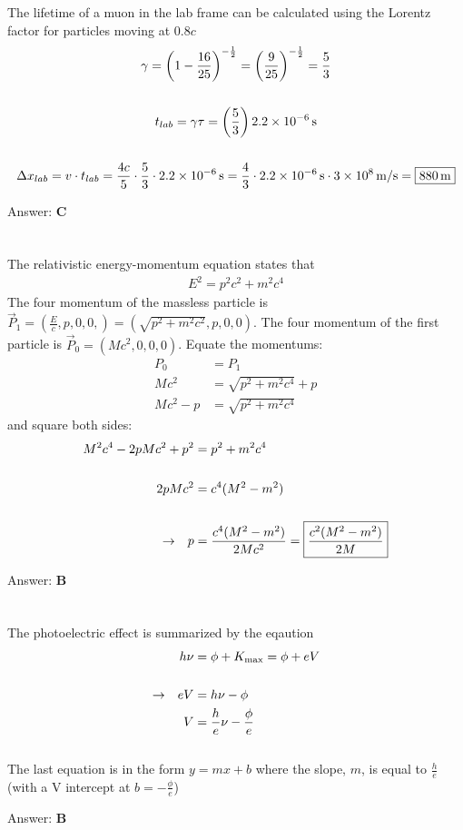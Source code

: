 \documentclass[12pt]{article}
\newcommand{\Answer}[1]{Answer: \textbf{#1}}
\newcommand{\Problem}[3]{
    \setcounter{section}{#1}
    \addtocounter{section}{-1}
    \section{}
    #3\par\par
    \Answer{#2}
}
\begin{document}
\Problem{39}{C}{%
The lifetime of a muon in the lab frame can be calculated using the Lorentz factor for particles moving at $0.8c$
\begin{gather}
\gamma = {\left(1- \frac{16}{25} \right)}^{-\frac{1}{2}} = {\left(\frac{9}{25}\right)}^{-\frac{1}{2}} = \frac{5}{3}\nonumber\\
\nonumber\\
t_{lab} = \gamma \tau = \left(\frac{5}{3}\right) 2.2\times 10^{-6}\,\text{s} \nonumber\\
\nonumber\\
\Delta x_{lab} = v \cdot t_{lab} = \frac{4 c}{5}\cdot \frac{5}{3}\cdot 2.2\times 10^{-6}\,\text{s} = \frac{4}{3}\cdot 2.2\times 10^{-6}\,\text{s} \cdot 3\times 10^{8}\,\text{m/s} = \boxed{880\,\text{m}} \nonumber
\end{gather}
}

\Problem{40}{B}{%
The relativistic energy-momentum equation states that
\begin{align}
E^{2} = p^{2}c^{2} + m^{2}c^{4}
\end{align}
The four momentum of the massless particle is $\vec{P}_{1} = (\frac{E}{c},p,0,0,) = (\sqrt{p^2+m^2c^2},p,0,0)$. The four momentum of the first particle is $\vec{P}_{0}=(Mc^{2},0,0,0)$. Equate the momentums:
\begin{align}
P_{0} &= P_{1}\nonumber\\
M^{}c^{2} &=  \sqrt{p^2+m^2c^4} + p^{}\nonumber\\
M^{}c^{2} -p^{} &=  \sqrt{p^2+m^2c^4}\nonumber
\end{align}
and square both sides:
\begin{align}
M^{2}c^{4} - 2p M c^{2} + p^{2} &=  p^2+m^2c^4\nonumber\\
\nonumber\\
2pMc^{2} &= c^{4}(M^{2}-m^{2}) \nonumber\\
\nonumber\\
\rightarrow \hspace{.1in} p &=  \frac{c^{4}(M^{2}-m^{2})}{2Mc^{2}} = \boxed{\frac{c^{2}(M^{2}-m^{2})}{2M}}\nonumber
\end{align}
}


\Problem{41}{B}{%
The photoelectric effect is summarized by the eqaution
\begin{align}
h \nu &= \phi + K_{\max}= \phi + e V\\
\nonumber\\
\rightarrow \hspace{.1in} eV &= h \nu - \phi \nonumber\\
V &=  \frac{h}{e} \nu - \frac{\phi}{e} \nonumber
\end{align}
\\
The last equation is in the form $y = mx + b$ where the slope, $m$, is equal to $\frac{h}{e}$ (with a V intercept at $b = -\frac{\phi}{e}$)
}
\end{document}
